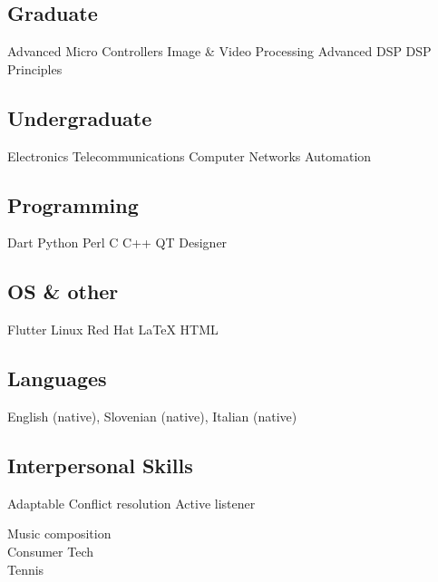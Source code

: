 \documentclass[draft]{dske-resume-openfont}
\begin{document}
\begin{minipage}[t]{0.31\textwidth}
{\fontsize{\the\smallerfont}{\the\smallerlinespace}\selectfont
\subsection{Graduate}
Advanced Micro Controllers \textbullet{} 
Image \& Video Processing \textbullet{}
Advanced DSP \textbullet{} 
DSP Principles
\vspace{\smallgap}

\subsection{Undergraduate}
Electronics \textbullet{} 
Telecommunications \textbullet{} 
Computer Networks \textbullet{} 
Automation
}

\vspace{\sectionpadding}


{\fontsize{\the\smallerfont}{\the\smallerlinespace}\selectfont
\subsection{Programming}
Dart \textbullet{} Python \textbullet{} Perl \textbullet{} C \textbullet{} C++ \textbullet{} QT Designer
\vspace{\smallgap}

\subsection{OS \& other}
Flutter \textbullet{} Linux Red Hat \textbullet{} \LaTeX{} \textbullet{} HTML
\vspace{\smallgap}

\subsection{Languages}
English {\footnotesize(native)}, Slovenian {\footnotesize(native)}, Italian {\footnotesize(native)}
\vspace{\smallgap}

\subsection{Interpersonal Skills}
Adaptable \textbullet{} Conflict resolution \textbullet{} Active listener
}
\vspace{\subsectionspace}
{\fontsize{\the\columnTextSize}{\the\columnLineSpace}\selectfont
Music composition\\
Consumer Tech\\
Tennis\\
}




\end{minipage}
\end{document}
